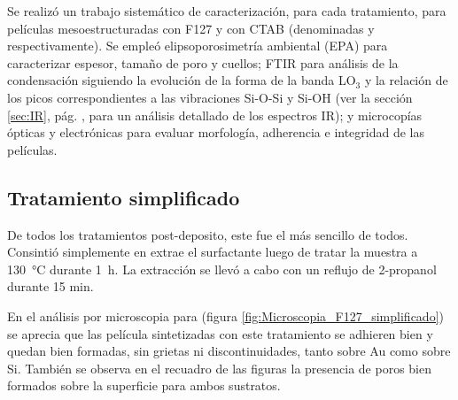 		Se realizó un trabajo sistemático de caracterización, para cada tratamiento, para películas mesoestructuradas con F127 y con CTAB (denominadas \pdmF\space y \pdmC\space respectivamente). Se empleó elipsoporosimetría ambiental (EPA) para caracterizar espesor, tamaño de poro y cuellos; FTIR para análisis de la condensación siguiendo la evolución de la forma de la banda LO$_3$ y la relación de los picos correspondientes a las vibraciones Si-O-Si y Si-OH (ver la sección \ref{sec:IR}, pág. \pageref{sec:IR}, para un análisis detallado de los espectros IR); y microcopías ópticas y electrónicas para evaluar morfología, adherencia e integridad de las películas.

	\subsection{Tratamiento simplificado}

		De todos los tratamientos post-deposito, este fue el más sencillo de todos. Consintió simplemente en extrae el surfactante luego de tratar la muestra a \SI{130}{\celsius} durante \SI{1}{\hour}. La extracción se llevó a cabo con un reflujo de 2-propanol durante 15 min. 
		
		En el análisis por microscopia para \pdmF\space (figura \ref{fig:Microscopia_F127_simplificado}) se aprecia que las película sintetizadas con este tratamiento se adhieren bien y quedan bien formadas, sin grietas ni discontinuidades, tanto sobre Au como sobre Si. También se observa en el recuadro de las figuras  la presencia de poros bien formados sobre la superficie para ambos sustratos.
			
